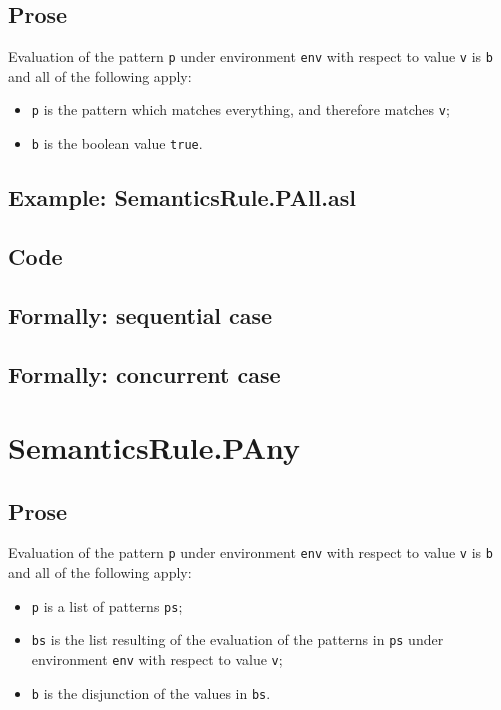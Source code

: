 \documentclass{book}
\begin{document}
  \subsection{Prose}
  Evaluation of the pattern \texttt{p} under environment \texttt{env} with
  respect to value \texttt{v} is \texttt{b} and all of the following apply:
  \begin{itemize}
    \item \texttt{p} is the pattern which matches everything, and therefore
      matches \texttt{v};
    \item \texttt{b} is the boolean value \texttt{true}.
  \end{itemize}

  \subsection{Example: SemanticsRule.PAll.asl}

  \subsection{Code}

\begin{emptyformal}
  \subsection{Formally: sequential case}

  \subsection{Formally: concurrent case}
\end{emptyformal}


\section{SemanticsRule.PAny \label{sec:SemanticsRule.PAny}}

    \subsection{Prose}
  Evaluation of the pattern \texttt{p} under environment \texttt{env} with
  respect to value \texttt{v} is \texttt{b} and all of the following apply:
    \begin{itemize}
      \item \texttt{p} is a list of patterns \texttt{ps};
      \item \texttt{bs} is the list resulting of the evaluation of the patterns in \texttt{ps} under environment \texttt{env} with respect to value \texttt{v};
      \item \texttt{b} is the disjunction of the values in \texttt{bs}.
    \end{itemize}
\end{document}
